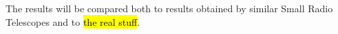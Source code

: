 The results will be compared both to results obtained by similar Small Radio Telescopes and to \hl{the real stuff}.


